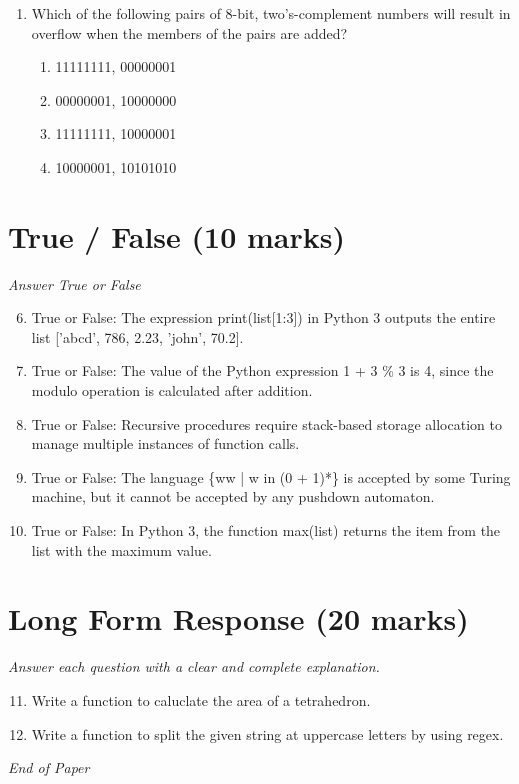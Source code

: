 \documentclass[12pt]{article}
\begin{document}
\begin{enumerate}[label=\arabic*.]
\begin{enumerate}[label=(\alph*)]
    \item 1
    \item 2
    \item 3
    \item 4
\end{enumerate}
\item Which of the following pairs of 8-bit, two's-complement numbers will result in overflow when the members of the pairs are added?
\begin{enumerate}[label=(\alph*)]
    \item 11111111, 00000001
    \item 00000001, 10000000
    \item 11111111, 10000001
    \item 10000001, 10101010
\end{enumerate}
\end{enumerate}

\section*{True / False (10 marks)}
\textit{Answer True or False}
\begin{enumerate}[label=\arabic*.]
\setcounter{enumi}{5}
\item True or False: The expression print(list[1:3]) in Python 3 outputs the entire list ['abcd', 786, 2.23, 'john', 70.2].
\item True or False: The value of the Python expression 1 + 3 \% 3 is 4, since the modulo operation is calculated after addition.
\item True or False: Recursive procedures require stack-based storage allocation to manage multiple instances of function calls.
\item True or False: The language \{ww | w in (0 + 1)*\} is accepted by some Turing machine, but it cannot be accepted by any pushdown automaton.
\item True or False: In Python 3, the function max(list) returns the item from the list with the maximum value.
\end{enumerate}

\section*{Long Form Response (20 marks)}
\textit{Answer each question with a clear and complete explanation.}
\begin{enumerate}[label=\arabic*.]
\setcounter{enumi}{10}
\item Write a function to caluclate the area of a tetrahedron.
\item Write a function to split the given string at uppercase letters by using regex.
\end{enumerate}

\vfill
\noindent\textit{End of Paper}
\end{document}
